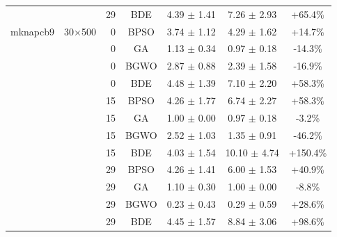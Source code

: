 \begin{table}[htbp]
\begin{tabular}{llrcccc}
             &          & 29 & BDE   & 4.39 $\pm$ 1.41    & 7.26 $\pm$ 2.93    & +65.4\% \\
mknapcb9     & 30×500   & 0 & BPSO  & 3.74 $\pm$ 1.12    & 4.29 $\pm$ 1.62    & +14.7\% \\
             &          & 0 & GA    & 1.13 $\pm$ 0.34    & 0.97 $\pm$ 0.18    & -14.3\% \\
             &          & 0 & BGWO  & 2.87 $\pm$ 0.88    & 2.39 $\pm$ 1.58    & -16.9\% \\
             &          & 0 & BDE   & 4.48 $\pm$ 1.39    & 7.10 $\pm$ 2.20    & +58.3\% \\
             &          & 15 & BPSO  & 4.26 $\pm$ 1.77    & 6.74 $\pm$ 2.27    & +58.3\% \\
             &          & 15 & GA    & 1.00 $\pm$ 0.00    & 0.97 $\pm$ 0.18    & -3.2\% \\
             &          & 15 & BGWO  & 2.52 $\pm$ 1.03    & 1.35 $\pm$ 0.91    & -46.2\% \\
             &          & 15 & BDE   & 4.03 $\pm$ 1.54    & 10.10 $\pm$ 4.74   & +150.4\% \\
             &          & 29 & BPSO  & 4.26 $\pm$ 1.41    & 6.00 $\pm$ 1.53    & +40.9\% \\
             &          & 29 & GA    & 1.10 $\pm$ 0.30    & 1.00 $\pm$ 0.00    & -8.8\% \\
             &          & 29 & BGWO  & 0.23 $\pm$ 0.43    & 0.29 $\pm$ 0.59    & +28.6\% \\
             &          & 29 & BDE   & 4.45 $\pm$ 1.57    & 8.84 $\pm$ 3.06    & +98.6\% \\
\bottomrule
\end{tabular}
\end{table}